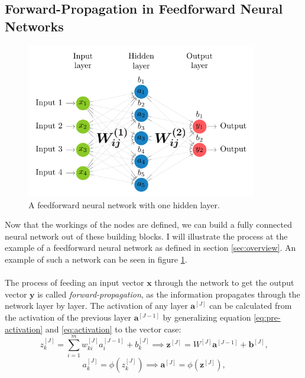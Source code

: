 \subsection{Forward-Propagation in Feedforward Neural Networks}
\label{subsec:forward-propagation}
\begin{figure}
    \centering
    \includegraphics[width=0.9\textwidth]{nn}
    \caption{A feedforward neural network with one hidden layer.}
    \label{fig:nn}
\end{figure}
Now that the workings of the nodes are defined, we can build a fully connected neural network out of these building blocks. 
I will illustrate the process at the example of a feedforward neural network as defined in section \ref{sec:overview}.
An example of such a network can be seen in figure \ref{fig:nn}. 
\\
\\
The process of feeding an input vector $\bm{x}$ through the network to get the output vector $\bm{y}$ is called \textit{forward-propagation}, as the information propagates through the network layer by layer. The activation of any layer $\bm{a}^{[J]}$ can be calculated from the activation of the previous layer $\bm{a}^{[J-1]}$ by generalizing equation \ref{eq:pre-activation} and \ref{eq:activation} to the vector case:
\begin{equation}
    z_k^{[J]} = \sum_{i=1}^{m} w_{ki}^{[J]} a_i^{[J-1]} + b_k^{[J]} \implies \bm{z}^{[J]} = W^{[J]} \bm{a}^{[J-1]} + \bm{b}^{[J]} \text{,}
    \label{eq:pre-activation-vector}
\end{equation}
\begin{equation}
    a_k^{[J]} = \phi(z_k^{[J]}) \implies \bm{a}^{[J]} = \phi(\bm{z}^{[J]}) \text{,}
    \label{eq:activation-vector}
\end{equation}
